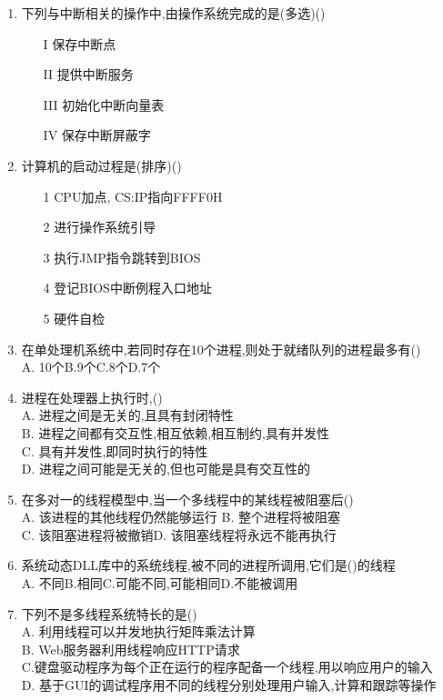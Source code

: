 \documentclass[12pt, a4paper, oneside, UTF8]{ctexbook}
\begin{document}
\begin{enumerate}
    \item \bt\bl 下列与中断相关的操作中,由操作系统完成的是(多选)()  
    \begin{enumerate}
        \item [I] 保存中断点
        \item [II] 提供中断服务
        \item [III] 初始化中断向量表
        \item [IV] 保存中断屏蔽字
    \end{enumerate}

    \item \bl 计算机的启动过程是(排序)() 
    \begin{enumerate}
        \item [1] CPU加点, CS:IP指向FFFF0H
        \item [2] 进行操作系统引导
        \item [3] 执行JMP指令跳转到BIOS
        \item [4] 登记BIOS中断例程入口地址
        \item [5] 硬件自检
    \end{enumerate}

    \item 在单处理机系统中,若同时存在10个进程,则处于就绪队列的进程最多有() \\
    A. 10个\qquad B.9个\qquad C.8个\qquad D.7个 

    \item 进程在处理器上执行时,() \\
    A. 进程之间是无关的,且具有封闭特性 \\
    B. 进程之间都有交互性,相互依赖,相互制约,具有并发性 \\
    C. 具有并发性,即同时执行的特性 \\
    D. 进程之间可能是无关的,但也可能是具有交互性的

    \item 在多对一的线程模型中,当一个多线程中的某线程被阻塞后() \\
    A. 该进程的其他线程仍然能够运行 \qquad B. 整个进程将被阻塞 \\
    C. 该阻塞进程将被撤销\qquad D. 该阻塞线程将永远不能再执行 

    \item 系统动态DLL库中的系统线程,被不同的进程所调用,它们是()的线程 \\
    A. 不同\qquad B.相同\qquad C.可能不同,可能相同\qquad D.不能被调用

    \item 下列不是多线程系统特长的是() \\
    A. 利用线程可以并发地执行矩阵乘法计算 \\
    B. Web服务器利用线程响应HTTP请求 \\
    C.键盘驱动程序为每个正在运行的程序配备一个线程,用以响应用户的输入 \\
    D. 基于GUI的调试程序用不同的线程分别处理用户输入,计算和跟踪等操作


\end{enumerate}
\end{document}
